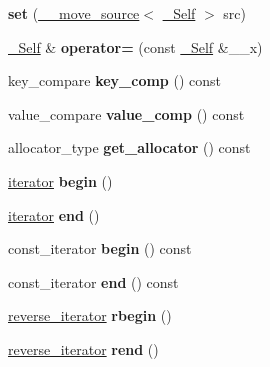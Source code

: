 \begin{DoxyCompactItemize}
\item 
\mbox{\label{classset_a3b09fb1f10f5d203e4c215ee19d3d306}} 
{\bfseries set} (\hyperlink{class____move__source}{\+\_\+\+\_\+move\+\_\+source}$<$ \hyperlink{classset}{\+\_\+\+Self} $>$ src)
\item 
\mbox{\label{classset_a25b44a8513c3ac8df666464ef68c2c4b}} 
\hyperlink{classset}{\+\_\+\+Self} \& {\bfseries operator=} (const \hyperlink{classset}{\+\_\+\+Self} \&\+\_\+\+\_\+x)
\item 
\mbox{\label{classset_a03e8b552ede7aa381a5d29c5763d72fa}} 
key\+\_\+compare {\bfseries key\+\_\+comp} () const
\item 
\mbox{\label{classset_a1fcea9df55d79fc1071b24a8657cf6f2}} 
value\+\_\+compare {\bfseries value\+\_\+comp} () const
\item 
\mbox{\label{classset_ac06222c31892eff9ddf35842505a27eb}} 
allocator\+\_\+type {\bfseries get\+\_\+allocator} () const
\item 
\mbox{\label{classset_a77fa62d30f9ee20f2071cf4ac8ee8e10}} 
\hyperlink{structiterator}{iterator} {\bfseries begin} ()
\item 
\mbox{\label{classset_a660145e272ac05f1ce1444e2daee41b2}} 
\hyperlink{structiterator}{iterator} {\bfseries end} ()
\item 
\mbox{\label{classset_a55a15411df3dbc7d2c1ede2e0a991afd}} 
const\+\_\+iterator {\bfseries begin} () const
\item 
\mbox{\label{classset_a774dff86a4116d759df53fe108c4abf9}} 
const\+\_\+iterator {\bfseries end} () const
\item 
\mbox{\label{classset_ab80d0e4a02e70e3fd5ddd73a570c7ace}} 
\hyperlink{classreverse__iterator}{reverse\+\_\+iterator} {\bfseries rbegin} ()
\item 
\mbox{\label{classset_ae35f7dd4b826d2e92f1e0aead0395fd4}} 
\hyperlink{classreverse__iterator}{reverse\+\_\+iterator} {\bfseries rend} ()
\item 

\end{DoxyCompactItemize}
